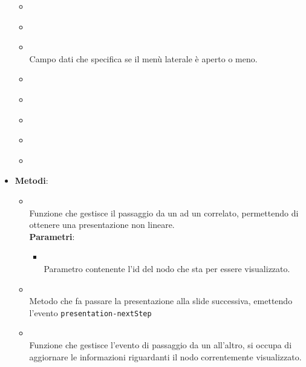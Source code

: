 \begin{itemize}
\begin{itemize}
\item {}
\\ \dpPresentationServiceField
\item {}
\\ \dpProjectServiceField
\item {}
\\ Campo dati che specifica se il menù laterale è aperto o meno.
\item {}
\\ \dpLocationField
\item {}
\\ \dpMDDialogServiceField
\item {}
\\ \dpQField
\item {}
\\ \dpRouteParamsField
\item {}
\\ \dpScopeField
\end{itemize}
\item \textbf{Metodi}:
\begin{itemize}
\item {}
\\ Funzione che gestisce il passaggio da un  ad un  correlato, permettendo di ottenere una presentazione non lineare.
\\ \textbf{Parametri}:
\begin{itemize}
\item {}
\\ Parametro contenente l'id del nodo che sta per essere visualizzato.
\end{itemize}
\item {}
\\ Metodo che fa passare la presentazione alla slide successiva, emettendo l'evento \texttt{presentation-nextStep}
\item {}
\\ Funzione che gestisce l'evento di passaggio da un  all'altro, si occupa di aggiornare le informazioni riguardanti il nodo correntemente visualizzato.

\end{itemize}
\end{itemize}
